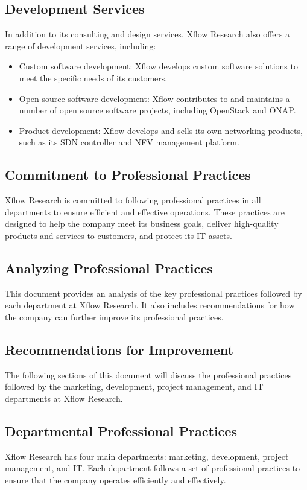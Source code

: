 \documentclass{article}
\begin{document}
\hfill \break

\subsection*{Development Services}

In addition to its consulting and design services, Xflow Research also offers a range of development services, including:

\begin{itemize}
  \item Custom software development: Xflow develops custom software solutions to meet the specific needs of its customers.
  \item Open source software development: Xflow contributes to and maintains a number of open source software projects, including OpenStack and ONAP.
  \item Product development: Xflow develops and sells its own networking products, such as its SDN controller and NFV management platform.
\end{itemize}

\subsection*{Commitment to Professional Practices}
Xflow Research is committed to following professional practices in all departments to ensure efficient and effective operations. These practices are designed to help the company meet its business goals, deliver high-quality products and services to customers, and protect its IT assets.

\subsection*{Analyzing Professional Practices}
This document provides an analysis of the key professional practices followed by each department at Xflow Research. It also includes recommendations for how the company can further improve its professional practices.

\subsection*{Recommendations for Improvement}
The following sections of this document will discuss the professional practices followed by the marketing, development, project management, and IT departments at Xflow Research.

\subsection*{Departmental Professional Practices}
Xflow Research has four main departments: marketing, development, project management, and IT. Each department follows a set of professional practices to ensure that the company operates efficiently and effectively.
\end{document}
